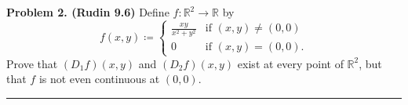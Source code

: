 \documentclass[leqno]{article}
\theoremstyle{nonumberplain}
\newcommand{\R}{\mathbb{R}}
\begin{document}
\pagebreak



\noindent\textbf{Problem 2. (Rudin 9.6)} Define $f\colon \R^2 \to \R$ by
\[
f(x,y)\coloneqq
\begin{cases}
\frac{xy}{x^2+y^2} & \textrm{if $(x,y)\neq (0,0)$}\\
0 & \textrm{if $(x,y)=(0,0)$.}
\end{cases}
\] 
Prove that $(D_1 f)(x,y)$ and $(D_2 f)(x,y)$ exist at every point of $\R^2$, but that $f$ is not even continuous at $(0,0)$.

\noindent\rule[0.5ex]{\linewidth}{1pt}
\end{document}
